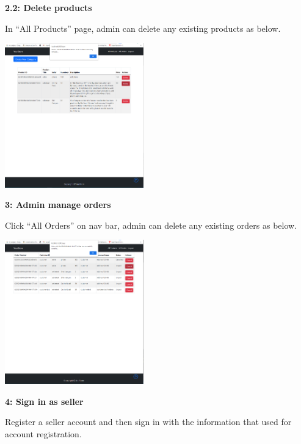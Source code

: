 \documentclass[12pt]{article}
\begin{document}
\newpage
\hspace*{5mm}\textbf{2.2: Delete products}

In “All Products” page, admin can delete any existing products as below.

\includegraphics[width=0.45\textwidth]{UserGuideImage/4.png}

\vspace*{5mm}
\textbf{3: Admin manage orders}

Click “All Orders” on nav bar, admin can delete any existing orders as below.

\includegraphics[width=0.45\textwidth]{UserGuideImage/5.png}

\newpage
\textbf{4: Sign in as seller}

Register a seller account and then sign in with the information that used for account registration.
\end{document}
